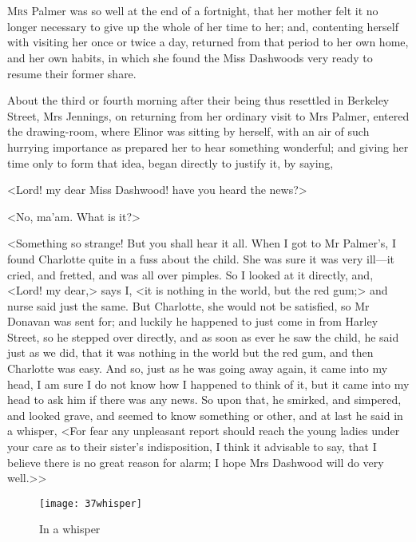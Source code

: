 \chapter[Chapter \thechapter]{}
\lettrine[lraise=0.3]{M}{rs} Palmer was so well at the end of a fortnight, that her mother felt it no longer necessary to give up the whole of her time to her; and, contenting herself with visiting her once or twice a day, returned from that period to her own home, and her own habits, in which she found the Miss Dashwoods very ready to resume their former share.

About the third or fourth morning after their being thus resettled in Berkeley Street, Mrs Jennings, on returning from her ordinary visit to Mrs Palmer, entered the drawing-room, where Elinor was sitting by herself, with an air of such hurrying importance as prepared her to hear something wonderful; and giving her time only to form that idea, began directly to justify it, by saying,

<Lord! my dear Miss Dashwood! have you heard the news?>

<No, ma'am. What is it?>

<Something so strange! But you shall hear it all. When I got to Mr Palmer's, I found Charlotte quite in a fuss about the child. She was sure it was very ill—it cried, and fretted, and was all over pimples. So I looked at it directly, and, <Lord! my dear,> says I, <it is nothing in the world, but the red gum;> and nurse said just the same. But Charlotte, she would not be satisfied, so Mr Donavan was sent for; and luckily he happened to just come in from Harley Street, so he stepped over directly, and as soon as ever he saw the child, he said just as we did, that it was nothing in the world but the red gum, and then Charlotte was easy. And so, just as he was going away again, it came into my head, I am sure I do not know how I happened to think of it, but it came into my head to ask him if there was any news. So upon that, he smirked, and simpered, and looked grave, and seemed to know something or other, and at last he said in a whisper, <For fear any unpleasant report should reach the young ladies under your care as to their sister's indisposition, I think it advisable to say, that I believe there is no great reason for alarm; I hope Mrs Dashwood will do very well.>>

\begin{figure}[tbph]
\centering
\texttt{[image: 37whisper]}
\caption{In a whisper}
\end{figure}

